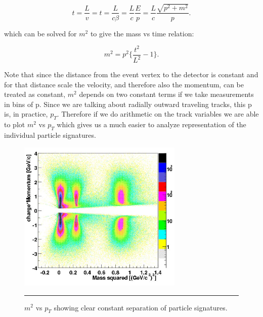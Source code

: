 \begin{equation}
t=\frac{L}{v} = t=\frac{L}{c\beta} = \frac{L}{c} \frac{E}{p} = \frac{L}{c} \frac{\sqrt{p^{2} + m^{2}}}{p}.
\end{equation}

which can be solved for $m^{2}$ to give the mass vs time relation:

\begin{equation}
m^{2} = p^{2} \bigg\{ \frac{t^{2}}{L^{2}} -1 \bigg\}.
\end{equation}

Note that since the distance from the event vertex to the detector is constant and for that distance scale the velocity, and therefore also the momentum, can be treated as constant, $m^{2}$ depends on two constant terms if we take measurements in bins of p. Since we are talking about radially outward traveling tracks, this p is, in practice, $p_{T}$. Therefore if we do arithmetic on the track variables we are able to plot $m^{2}$ vs $p_{T}$ which gives us a much easier to analyze representation of the individual particle signatures.

\begin{figure}[htbp!]
  \centering
    \includegraphics[width=0.7\textwidth]{Figures/m2tofvspt.jpg}
    \rule{35em}{0.5pt}
  \caption[$m^{2}$ vs $p_{T}$ showing clear constant separation of particle signatures.]{$m^{2}$ vs $p_{T}$ showing clear constant separation of particle signatures. \citep{tofchargemom}}
  \label{fig:m2tofvspt}
\end{figure}

\pagebreak
\pagebreak
